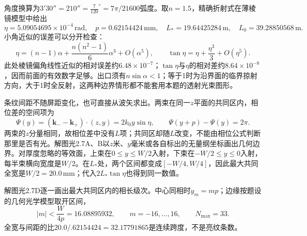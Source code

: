 \documentclass[UTF8,fontset=fandol,a4paper,11pt]{ctexart}
\newcommand{\figcaption}[1]{\par\vspace{2pt}{\small\color{muted}#1}\par}
\begin{document}
\begin{center}\begin{minipage}{.98\linewidth}\centering
{}
\figcaption{解图光2.7C\quad 出口正交分量中的切向波矢连续}
\end{minipage}\end{center}

角度换算为$3'30''=210''=\tfrac7{120}^{\circ}=7\pi/21600$弧度。取$n=1.5$，精确折射式在薄棱镜模型中给出
\[
\eta=5.09054695\times10^{-4}\,\mathrm{rad},\quad
p=0.62154424\,\mathrm{mm},\quad
L_*=19.64425284\,\mathrm m,\quad L_0=39.28850568\,\mathrm m.
\]
小角近似的误差可以分开检查：
\[
\eta=(n-1)\alpha+\frac{n(n^2-1)}6\alpha^3+O(\alpha^5),
\qquad \tan\eta=\eta+\frac{\eta^3}3+O(\eta^5).
\]
此处棱镜偏角线性近似的相对误差约$6.48\times10^{-7}$；$\tan\eta$与$\eta$的相对差约$8.64\times10^{-8}$，因而前面的有效数字足够。出口须有$n\sin\alpha<1$；等于1时为沿界面的临界掠射方向，大于1时全反射，这两种边界情形都不能套用本题的透射光束图形。

条纹间距不随屏距变化，也可直接从波矢求出。两束在同一$z$平面的共同区内，相位差的空间项为
\[
\Psi(y)=(\boldsymbol k_--\boldsymbol k_+)\!\cdot\!(z,y)
=2k_0y\sin\eta,\qquad
\Psi(y+p)-\Psi(y)=2\pi.
\]
两束的$z$分量相同，故相位差中没有$L$项；共同区却随$L$改变，不能由相位公式判断那里是否有光。解图光2.7A、B以$z$米、$y$毫米或各自标出的无量纲坐标画出几何边界。对厚度忽略的等效面，上束在$0\le y\le W/2$入射，下束在$-W/2\le y\le0$入射，每半束横向宽度是$W/2$。在$L_*$处，两个区间都变成$[-W/4,W/4]$，因此最大共同全宽是$W/2=20.0\,\mathrm{mm}$；代入$2L_*\tan\eta$也得到同一数值。

解图光2.7D逐一画出最大共同区内的相长级次。中心同相时$y_m=mp$；边缘按题设的几何光学模型取开区间，
\[
|m|<\frac{W}{4p}=16.08895932,
\qquad m=-16,\ldots,16,
\qquad N_{\max}=33.
\]
全宽与间距的比$20.0/.62154424=32.17791865$是连续跨度，不是亮纹条数。
\end{document}
